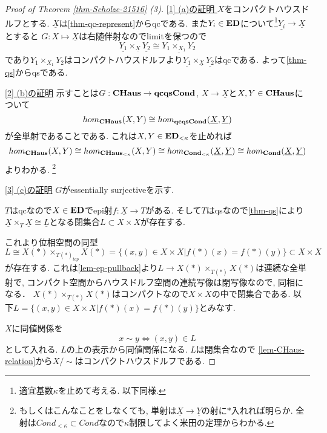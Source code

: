 \documentclass[dvipdfmx,a4paper,11pt]{report}
\theoremstyle{definition}
\begin{document}
\begin{proof}[Proof of Theorem \ref{thm-Scholze-21516} (3)]

\underline{[1] (a)の証明 }
$X$をコンパクトハウスドルフとする.
$\underline{X}$は\ref{thm-qc-represent}からqcである.
また$Y_i \in {\bf ED}$について\footnote{適宜基数$\kappa$を止めて考える. 以下同様.}$\underline{Y_i} \to \underline{X}$とすると
$G : X \mapsto \underline{X}$は右随伴射なのでlimitを保つので
$$
\underline{Y_1} \times_{\underline{X}}\underline{Y_2}
\cong  
\underline{Y_1 \times_{X_1}Y_2}
$$
であり$Y_1 \times_{X_1}Y_2$はコンパクトハウスドルフより$\underline{Y_1} \times_{\underline{X}}\underline{Y_2}$はqcである. よって\ref{thm-qs}からqsである.

\underline{[2] (b)の証明}
示すことは$G : {\bf CHaus} \to {\bf qcqsCond}$, $X \to \underline{X}$と$X,Y \in {\bf CHaus}$について
$$
hom_{\bf CHaus} (X,Y) \cong 
hom_{\bf qcqsCond}(\underline{X}, \underline{Y})
$$
が全単射であることである.
これは$X,Y \in {\bf ED}_{< \kappa}$を止めれば
$$
hom_{\bf CHaus} (X,Y) \cong 
hom_{\bf CHaus_{< \kappa}} (X,Y) \cong
hom_{\bf Cond_{< \kappa}}(\underline{X}, \underline{Y})
\cong hom_{\bf Cond}(\underline{X}, \underline{Y})
$$
よりわかる. \footnote{もしくはこんなことをしなくても, 単射は$\underline{X} \to \underline{Y}$の射に$\ast$入れれば明らか. 全射は$Cond_{< \kappa} \subset Cond$なので$\kappa$制限してよく米田の定理からわかる.}

\underline{[3] (c)の証明}
$G$がessentially surjectiveを示す. 

$T$はqcなので$X \in {\bf ED}$でepi射$f : \underline{X} \to T$がある. %
そして$T$はqsなので\ref{thm-qs}により
$\underline{X} \times_{T} \underline{X} \cong \underline{L}$となる閉集合$L \subset X \times X$が存在する. 

これより位相空間の同型
$$
L \cong  X(\ast) \times_{T(\ast)_{top}} X(\ast)=  \{ (x,y) \in X \times X | f(\ast)(x) = f(\ast)(y)\} \subset X \times X
$$ 
が存在する. 
これは\ref{lem-ep-pullback}より$L \to  X(\ast) \times_{T(\ast)} X(\ast)$は連続な全単射で, コンパクト空間からハウスドルフ空間の連続写像は閉写像なので, 同相になる．
$X(\ast) \times_{T(\ast)} X(\ast)$はコンパクトなので$X \times X$の中で閉集合である. 
以下$L=\{ (x,y) \in X \times X | f(\ast)(x) = f(\ast)(y)\}$とみなす. 

$X$に同値関係を
$$
x \sim y \Leftrightarrow (x,y) \in L
$$
として入れる. $L$の上の表示から同値関係になる. 
$L$は閉集合なので
\ref{lem-CHaus-relation}から$X / \sim $はコンパクトハウスドルフである.


\end{proof}
\end{document}
